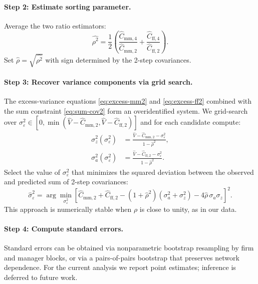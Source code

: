 \documentclass[11pt]{article}
\begin{document}
\paragraph{Step 2: Estimate sorting parameter.}
Average the two ratio estimators:
\begin{equation}
 \widehat{\rho^2} = \frac{1}{2}\left(\frac{\widehat C_{\text{mm},4}}{\widehat C_{\text{mm},2}} + \frac{\widehat C_{\text{ff},4}}{\widehat C_{\text{ff},2}}\right).
\end{equation}
Set $\widehat\rho = \sqrt{\widehat{\rho^2}}$ with sign determined by the 2-step covariances.

\paragraph{Step 3: Recover variance components via grid search.}
The excess-variance equations \eqref{eq:excess-mm2} and \eqref{eq:excess-ff2} combined with the sum constraint \eqref{eq:sum-cov2} form an overidentified system. We grid-search over $\sigma_\varepsilon^2 \in [0, \min(\widehat V - \widehat C_{\text{mm},2}, \widehat V - \widehat C_{\text{ff},2})]$ and for each candidate compute:
\begin{align}
 \sigma_z^2(\sigma_\varepsilon^2) &= \frac{\widehat V - \widehat C_{\text{mm},2} - \sigma_\varepsilon^2}{1 - \widehat\rho^2}, \\
 \sigma_a^2(\sigma_\varepsilon^2) &= \frac{\widehat V - \widehat C_{\text{ff},2} - \sigma_\varepsilon^2}{1 - \widehat\rho^2}.
\end{align}
Select the value of $\sigma_\varepsilon^2$ that minimizes the squared deviation between the observed and predicted sum of 2-step covariances:
\begin{equation}
 \widehat\sigma_\varepsilon^2 = \arg\min_{\sigma_\varepsilon^2} \left[\widehat C_{\text{mm},2} + \widehat C_{\text{ff},2} - (1+\widehat\rho^2)(\sigma_a^2 + \sigma_z^2) - 4\widehat\rho\,\sigma_a\sigma_z\right]^2.
\end{equation}
This approach is numerically stable when $\rho$ is close to unity, as in our data.

\paragraph{Step 4: Compute standard errors.}
Standard errors can be obtained via nonparametric bootstrap resampling by firm and manager blocks, or via a pairs-of-pairs bootstrap that preserves network dependence. For the current analysis we report point estimates; inference is deferred to future work.
\end{document}
